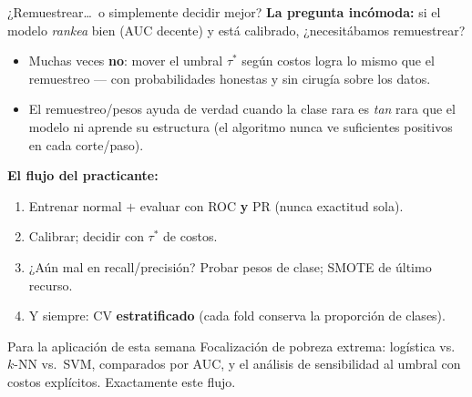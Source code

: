 \documentclass{beamer}
\newcommand{\1}{\mathbb{I}}
\begin{document}
\begin{frame}{¿Remuestrear\ldots\ o simplemente decidir mejor?}
\small
\textbf{La pregunta incómoda:} si el modelo \emph{rankea} bien (AUC decente) y está calibrado, ¿necesitábamos remuestrear?
\pause

\vspace{0.15cm}
\begin{itemize}\itemsep5pt
  \item Muchas veces \textbf{no}: mover el umbral $\tau^*$ según costos logra lo mismo que el remuestreo --- con probabilidades honestas y sin cirugía sobre los datos.
  \item El remuestreo/pesos ayuda de verdad cuando la clase rara es \emph{tan} rara que el modelo ni aprende su estructura (el algoritmo nunca ve suficientes positivos en cada corte/paso). \pause
\end{itemize}

\vspace{0.15cm}
\textbf{El flujo del practicante:}
\begin{enumerate}\itemsep3pt
  \item Entrenar normal $+$ evaluar con ROC \textbf{y} PR (nunca exactitud sola).
  \item Calibrar; decidir con $\tau^*$ de costos.
  \item ¿Aún mal en recall/precisión? Probar pesos de clase; SMOTE de último recurso.
  \item Y siempre: CV \textbf{estratificado} (cada fold conserva la proporción de clases).
\end{enumerate}
\pause

\begin{block}{Para la aplicación de esta semana}
Focalización de pobreza extrema: logística vs.\ $k$-NN vs.\ SVM, comparados por AUC, y el análisis de sensibilidad al umbral con costos explícitos. Exactamente este flujo.
\end{block}
\end{frame}
\end{document}
